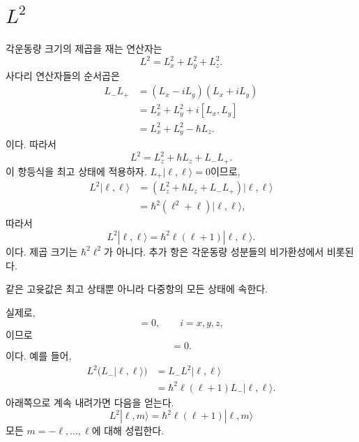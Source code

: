 \section{\texorpdfstring{\(L^2\)}{의 공통 고윳값}}

각운동량 크기의 제곱을 재는 연산자는
\begin{equation}
L^2=L_x^2+L_y^2+L_z^2.
\end{equation}
사다리 연산자들의 순서곱은
\begin{align}
L_-L_+
&=(L_x-iL_y)(L_x+iL_y) \\
&=L_x^2+L_y^2+i[L_x,L_y] \\
&=L_x^2+L_y^2-\hbar L_z.
\end{align}
이다. 따라서
\begin{equation}
L^2=L_z^2+\hbar L_z+L_-L_+.
\end{equation}
이 항등식을 최고 상태에 적용하자. \(L_+|\ell,\ell\rangle=0\)이므로,
\begin{align}
L^2|\ell,\ell\rangle
&=\left(L_z^2+\hbar L_z+L_-L_+\right)|\ell,\ell\rangle \\
&=\hbar^2\left(\ell^2+\ell\right)|\ell,\ell\rangle,
\end{align}
따라서
\begin{equation}
L^2|\ell,\ell\rangle
=\hbar^2\ell(\ell+1)|\ell,\ell\rangle.
\end{equation}
이다. 제곱 크기는 \(\hbar^2\ell^2\)가 아니다. 추가 항은 각운동량 성분들의 비가환성에서 비롯된다.

같은 고윳값은 최고 상태뿐 아니라 다중항의 모든 상태에 속한다.

\begin{classroomqa}\end{classroomqa}

실제로,
\begin{equation}
[L^2,L_i]=0,
\qquad i=x,y,z,
\end{equation}
이므로
\begin{equation}
[L^2,L_\pm]=0.
\end{equation}
이다. 예를 들어,
\begin{align}
L^2\bigl(L_-|\ell,\ell\rangle\bigr)
&=L_-L^2|\ell,\ell\rangle \\
&=\hbar^2\ell(\ell+1)L_-|\ell,\ell\rangle.
\end{align}
아래쪽으로 계속 내려가면 다음을 얻는다.
\begin{equation}
L^2|\ell,m\rangle
=\hbar^2\ell(\ell+1)|\ell,m\rangle
\end{equation}
모든 \(m=-\ell,\ldots,\ell\)에 대해 성립한다.

